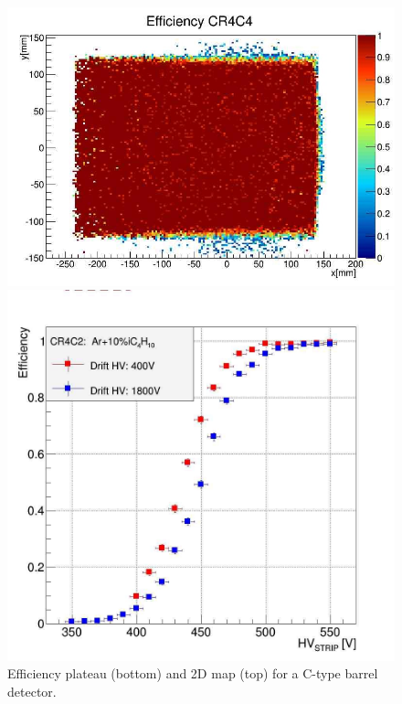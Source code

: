 \begin{figure}[htb]
 \includegraphics[width=1.0\columnwidth,keepaspectratio]{images/Eff_2D}
 
 \includegraphics[width=1.0\columnwidth,keepaspectratio]{images/Plateau_HV}
 
 \caption{Efficiency plateau (bottom) and 2D map (top) for a C-type barrel detector.}
 \label{fig:mm-fig8}
\end{figure}


